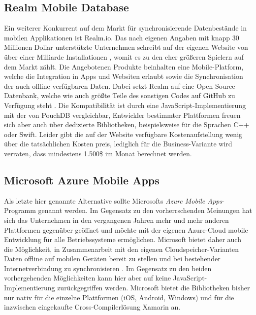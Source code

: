 \subsection{Realm Mobile Database}
Ein weiterer Konkurrent auf dem Markt für synchronisierende Datenbestände in mobilen Applikationen ist Realm.io. Das nach eigenen Angaben mit knapp 30 Millionen Dollar unterstützte Unternehmen schreibt auf der eigenen Website von über einer Milliarde Installationen \cite{realm:about}, womit es zu den eher größeren Spielern auf dem Markt zählt. Die Angebotenen Produkte beinhalten eine Mobile-Platform, welche die Integration in Apps und Websiten erlaubt sowie die Synchronisation der auch offline verfügbaren Daten. Dabei setzt Realm auf eine Open-Source Datenbank, welche wie auch größte Teile des sonstigen Codes auf GitHub zu Verfügung steht \cite{realm:githubrepo}. Die Kompatibilität ist durch eine JavaScript-Implementierung mit der von PouchDB vergleichbar, Entwickler bestimmter Plattformen freuen sich aber auch über dedizierte Bibliotheken, beispielsweise für die Sprachen C++ oder Swift. Leider gibt die auf der Website verfügbare Kostenaufstellung wenig über die tatsächlichen Kosten preis, lediglich für die Business-Variante wird verraten, dass mindestens 1.500\$ im Monat berechnet werden.

\subsection{Microsoft Azure Mobile Apps}
Als letzte hier genannte Alternative sollte Microsofts \emph{Azure Mobile Apps}-Programm genannt werden. Im Gegensatz zu den vorherrschenden Meinungen hat sich das Unternehmen in den vergangenen Jahren mehr und mehr anderen Plattformen gegenüber geöffnet und möchte mit der eigenen Azure-Cloud mobile Entwicklung für alle Betriebssysteme ermöglichen.
Microsoft bietet daher auch die Möglichkeit, in Zusammenarbeit mit den eigenen Cloudspeicher-Varianten Daten offline auf mobilen Geräten bereit zu stellen und bei bestehender Internetverbindung zu synchronisieren \cite{microsoft:azuremobileappssync}. Im Gegensatz zu den beiden vorhergehenden Möglichkeiten kann hier aber auf keine JavaScript-Implementierung zurückgegriffen werden. Microsoft bietet die Bibliotheken bisher nur nativ für die einzelne Plattformen (iOS, Android, Windows) und für die inzwischen eingekaufte Cross-Compilerlösung Xamarin an.
